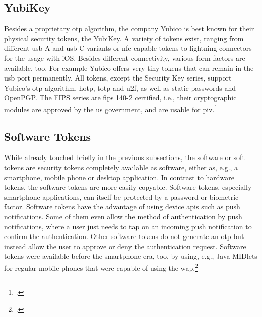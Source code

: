 \subsection{YubiKey}

Besides a proprietary \gls{otp} algorithm, the company Yubico is best known for their physical security tokens, the YubiKey. A variety of tokens exist, ranging from different \gls{usb}-A and \gls{usb}-C variants or \gls{nfc}-capable tokens to lightning connectors for the usage with iOS. Besides different connectivity, various form factors are available, too. For example Yubico offers very tiny tokens that can remain in the \gls{usb} port permanently. All tokens, except the \frqq Security Key\flqq{} series, support Yubico's \gls{otp} algorithm, \gls{hotp}, \gls{totp} and \gls{u2f}, as well as static passwords and OpenPGP. The \frqq FIPS series\flqq{} are \gls{fips} 140-2 certified, i.e., their cryptographic modules are approved by the \gls{us} government, and are usable for \gls{piv}.\footcites[See][716]{HUSEYNOV2017715}[See][83]{Jacobs:2016:STA:2953926.2953927}[See][109]{Jacobs:2019}

\subsection{Software Tokens}

While already touched briefly in the previous subsections, the software or soft tokens are security tokens completely available as software, either as, e.g., a smartphone, mobile phone or desktop application. In contrast to hardware tokens, the software tokens are more easily copyable. Software tokens, especially smartphone applications, can itself be protected by a password or biometric factor. Software tokens have the advantage of using device \glspl{api} such as push notifications. Some of them even allow the method of \frqq authentication by push notifications\flqq, where a user just needs to tap on an incoming push notification to confirm the authentication. Other software tokens do not generate an \gls{otp} but instead allow the user to approve or deny the authentication request. Software tokens were available before the smartphone era, too, by using, e.g., Java MIDlets for regular mobile phones that were capable of using the \gls{wap}.\footcites[See][717]{HUSEYNOV2017715}[See][111]{ELMALIKI201475}[See][60]{Ulqinaku:2019:FPP:3317549.3323404}[See][222--223]{dasgupta2017multi}[See][3]{4300040}
